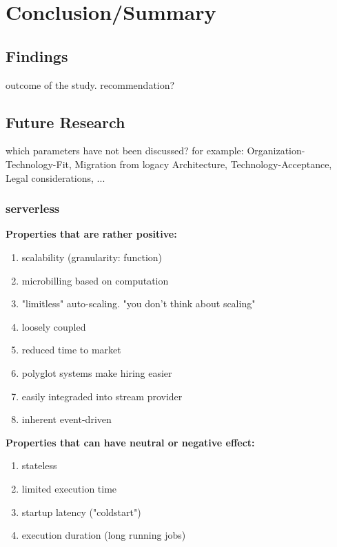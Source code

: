 \chapter{Conclusion/Summary}


\section{Findings}

outcome of the study. recommendation?

\autocite{whatEvEv2017}


\section{Future Research}

which parameters have not been discussed? for example: Organization-Technology-Fit, Migration from logacy Architecture, Technology-Acceptance, Legal considerations, ...


\subsection{serverless}


\textbf{Properties that are rather positive:}
\begin{enumerate}
    \item scalability (granularity: function)
    \item microbilling based on computation
    \item "limitless" auto-scaling. "you don't think about scaling"
    \item loosely coupled
    \item reduced time to market
    \item polyglot systems make hiring easier
    \item easily integraded into stream provider
    \item inherent event-driven
\end{enumerate}

\textbf{Properties that can have neutral or negative effect:}
\begin{enumerate}
    \item stateless 
    \item limited execution time
    \item startup latency ("coldstart")
    \item execution duration (long running jobs)
\end{enumerate}


